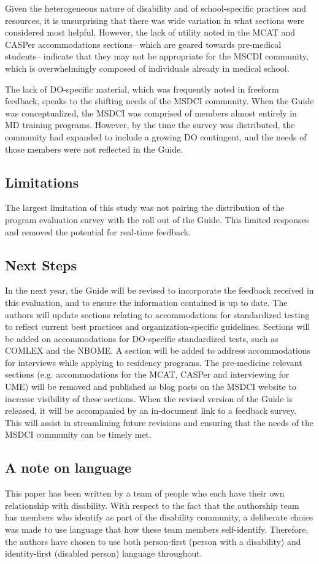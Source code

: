 \documentclass[11.5pt]{sig-alternate} %
\begin{document}
\begin{large}
Given the heterogeneous nature of disability and of school-specific practices and resources, it is unsurprising that there was wide variation in what sections were considered most helpful. However, the lack of utility noted in the MCAT and CASPer accommodations sections– which are geared towards pre-medical students– indicate that they may not be appropriate for the MSCDI community, which is overwhelmingly composed of individuals already in medical school. 

The lack of DO-specific material, which was frequently noted in freeform feedback, speaks to the shifting needs of the MSDCI community. When the Guide was conceptualized, the MSDCI was comprised of members almost entirely in MD training programs. However, by the time the survey was distributed, the community had expanded to include a growing DO contingent, and the needs of those members were not reflected in the Guide.

\subsection*{Limitations}
The largest limitation of this study was not pairing the distribution of the program evaluation survey with the roll out of the Guide. This limited responses and removed the potential for real-time feedback.

\subsection*{Next Steps}
In the next year, the Guide will be revised to incorporate the feedback received in this evaluation, and to ensure the information contained is up to date. The authors will update sections relating to accommodations for standardized testing to reflect current best practices and organization-specific guidelines. Sections will be added on accommodations for DO-specific standardized tests, such as COMLEX and the NBOME. A section will be added to address accommodations for interviews while applying to residency programs. The pre-medicine relevant sections (e.g. accommodations for the MCAT, CASPer and interviewing for UME) will be removed and published as blog posts on the MSDCI website to increase visibility of these sections. When the revised version of the Guide is released, it will be accompanied by an in-document link to a feedback survey. This will assist in streamlining future revisions and ensuring that the needs of the MSDCI community can be timely met.

\subsection*{A note on language}
This paper has been written by a team of people who each have their own relationship with disability. With respect to the fact that the authorship team has members who identify as part of the disability community, a deliberate choice was made to use language that how these team members self-identify. Therefore, the authors have chosen to use both person-first (person with a disability) and identity-first (disabled person) language throughout.

\end{large}
\clearpage
\end{document}
